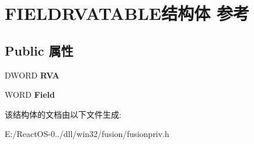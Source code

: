 \hypertarget{struct_f_i_e_l_d_r_v_a_t_a_b_l_e}{}\section{F\+I\+E\+L\+D\+R\+V\+A\+T\+A\+B\+L\+E结构体 参考}
\label{struct_f_i_e_l_d_r_v_a_t_a_b_l_e}
\subsection*{Public 属性}
\begin{DoxyCompactItemize}
\item 
\mbox{\label{struct_f_i_e_l_d_r_v_a_t_a_b_l_e_a23c880eaf7cbf76fb8ef86e5924d51f1}} 
D\+W\+O\+RD {\bfseries R\+VA}
\item 
\mbox{\label{struct_f_i_e_l_d_r_v_a_t_a_b_l_e_aadd0da27334ad691c336ce53b41c297e}} 
W\+O\+RD {\bfseries Field}
\end{DoxyCompactItemize}


该结构体的文档由以下文件生成\+:\begin{DoxyCompactItemize}
\item 
E\+:/\+React\+O\+S-\/0../dll/win32/fusion/fusionpriv.\+h\end{DoxyCompactItemize}
